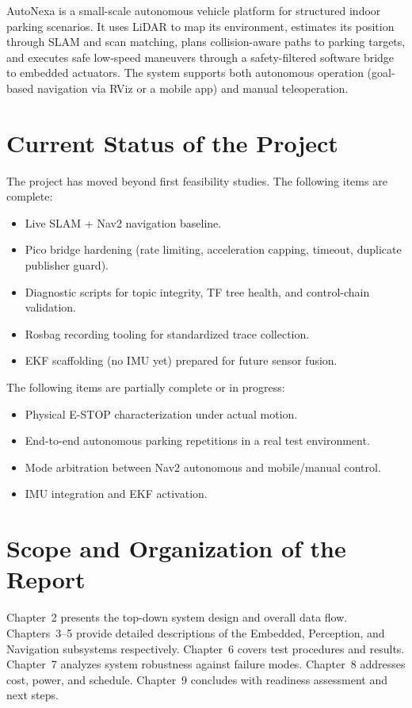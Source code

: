 \documentclass[12pt,a4paper]{report}
\newcommand{\pname}{AutoNexa}
\begin{document}
\pname{} is a small-scale autonomous vehicle platform for structured indoor parking scenarios. It uses LiDAR to map its environment, estimates its position through SLAM and scan matching, plans collision-aware paths to parking targets, and executes safe low-speed maneuvers through a safety-filtered software bridge to embedded actuators. The system supports both autonomous operation (goal-based navigation via RViz or a mobile app) and manual teleoperation.

\section{Current Status of the Project}

The project has moved beyond first feasibility studies. The following items are complete:

\begin{itemize}
    \item Live SLAM + Nav2 navigation baseline.
    \item Pico bridge hardening (rate limiting, acceleration capping, timeout, duplicate publisher guard).
    \item Diagnostic scripts for topic integrity, TF tree health, and control-chain validation.
    \item Rosbag recording tooling for standardized trace collection.
    \item EKF scaffolding (no IMU yet) prepared for future sensor fusion.
\end{itemize}

The following items are partially complete or in progress:

\begin{itemize}
    \item Physical E-STOP characterization under actual motion.
    \item End-to-end autonomous parking repetitions in a real test environment.
    \item Mode arbitration between Nav2 autonomous and mobile/manual control.
    \item IMU integration and EKF activation.
\end{itemize}

\section{Scope and Organization of the Report}

Chapter~2 presents the top-down system design and overall data flow. Chapters~3--5 provide detailed descriptions of the Embedded, Perception, and Navigation subsystems respectively. Chapter~6 covers test procedures and results. Chapter~7 analyzes system robustness against failure modes. Chapter~8 addresses cost, power, and schedule. Chapter~9 concludes with readiness assessment and next steps.
\end{document}
